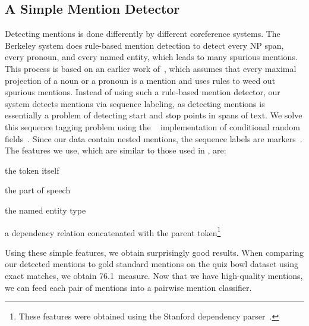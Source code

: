 \subsection{A Simple Mention Detector}
Detecting mentions is done differently by different coreference systems. The
Berkeley system does rule-based mention detection to detect every NP span, every
pronoun, and every named entity, which leads to many spurious mentions. This
process is based on an earlier work of~, which
assumes that every maximal projection of a noun or a pronoun is a mention and
uses rules to weed out spurious mentions. Instead of using such a rule-based
mention detector, our system detects mentions via sequence labeling, as
detecting mentions is essentially a problem of detecting start and stop points
in spans of text. We solve this sequence tagging problem using the
~\cite{McCallumMALLET} implementation of conditional random
fields~\cite{lafferty2001conditional}. Since our data contain nested mentions,
the sequence labels are  markers~\cite{ratinov2009design}. The features
we use, which are similar to those used in , are:
\begin{itemize*}
\item the token itself
\item the part of speech
\item the named entity type
\item a dependency relation concatenated with the parent token\footnote{These features were obtained using the Stanford dependency parser~\cite{de2006generating}.}
\end{itemize*}

Using these simple features, we obtain surprisingly good results. When comparing
our detected mentions to gold standard mentions on the quiz bowl dataset using
exact matches, we obtain 76.1\
measure. Now that we have high-quality mentions, we can feed each pair of
mentions into a pairwise mention classifier.

